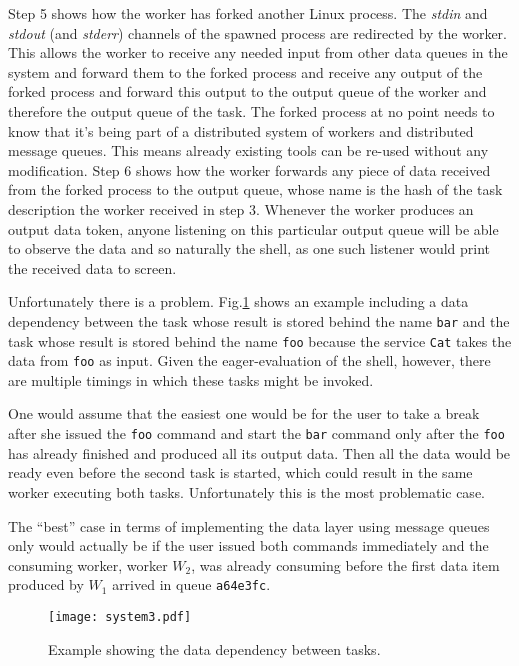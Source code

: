 Step 5 shows how the worker has forked another Linux process.
The \textit{stdin} and \textit{stdout} (and \textit{stderr})
channels of the spawned process are redirected by the worker.
This allows the worker to receive any needed input from other
data queues in the system and forward them to the forked process
and receive any output of the forked process and forward this
output to the output queue of the worker and therefore the output
queue of the task. The forked process at no point needs to know
that it's being part of a distributed system of workers and
distributed message queues. This means already existing tools
can be re-used without any modification.
Step 6 shows how the worker forwards any piece of data
received from the forked process to the output queue, whose
name is the hash of the task description the worker received
in step 3. Whenever the worker produces an output data token,
anyone listening on this particular output queue will be able
to observe the data and so naturally the shell, as one such
listener would print the received data to screen.
\newline

Unfortunately there is a problem. Fig.\ref{system3} shows an
example including a data dependency between the task whose
result is stored behind the name \texttt{bar} and the task
whose result is stored behind the name \texttt{foo} because
the service \texttt{Cat} takes the data from \texttt{foo}
as input. Given the eager-evaluation of the shell, however,
there are multiple timings in which these
tasks might be invoked.

One would assume that the easiest one would be for the user
to take a break after she issued the \texttt{foo} command and
start the \texttt{bar} command only after the \texttt{foo}
has already finished and produced all its output data.
Then all the data would be ready even before the second task
is started, which could result in the same worker executing
both tasks. Unfortunately this is the most problematic case.

The ``best'' case in terms of implementing the data layer
using message queues only would actually be if the user
issued both commands immediately and the consuming worker,
worker $W_{2}$, was already consuming before the first data
item produced by $W_{1}$ arrived in queue \texttt{a64e3fc}.

\begin{figure}[h]
  \texttt{[image: system3.pdf]}
  \caption{Example showing the data dependency between tasks.}
  \label{system3}
\end{figure}

